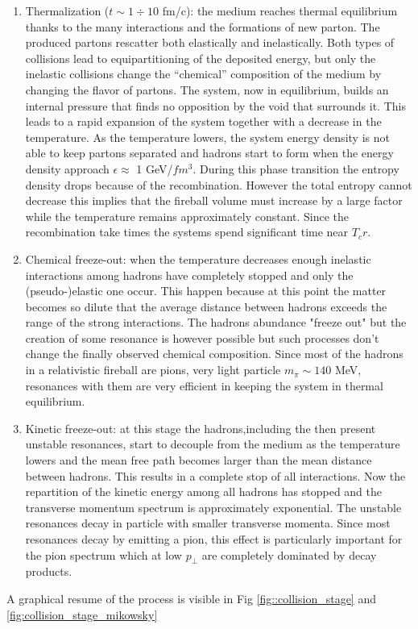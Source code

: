 \documentclass[12pt,a4paper]{book}
\begin{document}
\begin{enumerate}
		\item  Thermalization ($t \sim 1 \div10$ fm/c): the medium reaches thermal equilibrium thanks to the many interactions and the formations of new parton. The produced partons rescatter both elastically and inelastically. Both types of collisions lead to equipartitioning of the deposited energy, but only the inelastic collisions change the “chemical” composition of the medium by changing the flavor of partons. The system, now in equilibrium, builds an internal pressure that finds no opposition by the void that surrounds it. This leads to a rapid expansion of the system together with a decrease in the temperature. As the temperature lowers, the system energy density is not able to keep partons separated and hadrons start to form when the energy density approach $\epsilon \approx$  1 GeV/$fm^3$. During this phase transition the entropy density drops because of the recombination. However the total entropy cannot decrease this implies that the fireball volume must increase by a large factor while the temperature remains approximately constant. Since the recombination take times the systems spend significant time near $T_cr$.
		
		\item Chemical freeze-out: when the temperature decreases enough inelastic interactions among hadrons have completely stopped and only the (pseudo-)elastic one occur. This happen because at this point the matter becomes so dilute that the average distance between hadrons exceeds the range of the strong interactions. The hadrons abundance "freeze out" but the creation of some resonance is however possible but such processes don’t change the finally observed chemical composition. Since most of the	hadrons in a relativistic fireball are pions, very light particle $m_\pi \sim 140$ MeV, resonances with them are very efficient in keeping the system in thermal equilibrium.
		
		\item Kinetic freeze-out: at this stage the hadrons,including the then present unstable resonances, start to decouple from the medium as the temperature lowers and the mean free path becomes larger than the mean distance	between hadrons. This results in a complete stop of all interactions. Now the repartition of the kinetic energy among all hadrons has stopped and	the transverse momentum spectrum is approximately exponential. The unstable resonances decay in particle with smaller transverse momenta. Since most resonances decay by emitting a pion, this effect is particularly important for the pion spectrum which at low $p_\perp$ are completely dominated by decay products. 
		
	\end{enumerate}
	A graphical resume of the process is visible in Fig \ref{fig::collision_stage} and \ref{fig:collision_stage_mikowsky}
	
\end{document}
